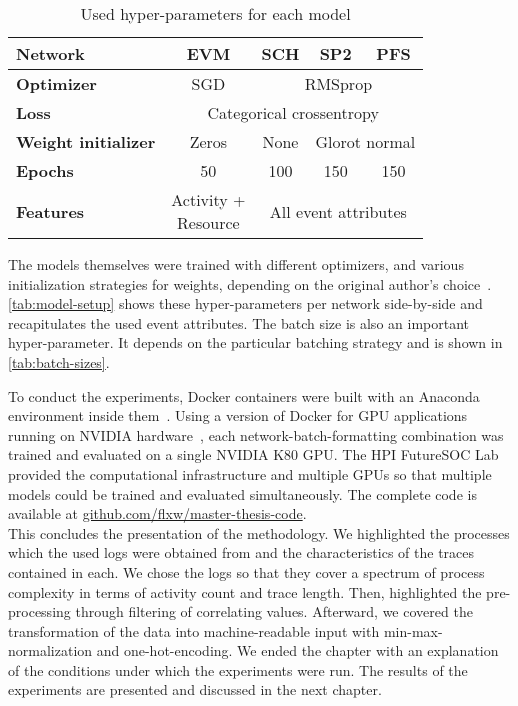 \begin{table}[!htb]
\centering
\begin{tabular}{lcccc}
\textbf{Network}&\textbf{EVM}&\textbf{SCH}&\textbf{SP2}&\textbf{PFS}\\
\midrule
\textbf{Optimizer} & SGD & \multicolumn{3}{c}{RMSprop} \\
\textbf{Loss}      &\multicolumn{4}{c}{Categorical crossentropy}\\
\textbf{Weight initializer} & Zeros & None & \multicolumn{2}{c}{Glorot normal}\\
\textbf{Epochs}    & 50 & 100 & 150 & 150\\
\textbf{Features}  & \makecell{Activity +\\Resource} & \multicolumn{3}{c}{All event attributes}\\
\end{tabular}
\caption{Used hyper-parameters for each model}
\label{tab:model-setup}
\end{table}

The models themselves were trained with different optimizers, and various initialization strategies for weights, depending on the original author's choice~\cite{evermann2016, schoenig2018}. \autoref{tab:model-setup} shows these hyper-parameters per network side-by-side and recapitulates the used event attributes. The batch size is also an important hyper-parameter. It depends on the particular batching strategy and is shown in \autoref{tab:batch-sizes}.

To conduct the experiments, Docker containers were built with an Anaconda environment inside them~\cite{web:docker}. Using a version of Docker for GPU applications running on NVIDIA hardware~\cite{web:nvidia-docker}, each network-batch-formatting combination was trained and evaluated on a single NVIDIA K80 GPU. The HPI FutureSOC Lab~\cite{web:fsoc} provided the computational infrastructure and multiple GPUs so that multiple models could be trained and evaluated simultaneously. The complete code is available at \href{https://github.com/flxw/master-thesis-code}{github.com/flxw/master-thesis-code}.\\

This concludes the presentation of the methodology.
We highlighted the processes which the used logs were obtained from and the
characteristics of the traces contained in each.
We chose the logs so that they cover a spectrum of process complexity in terms of activity count and trace length.
Then, highlighted the pre-processing through filtering of correlating values.
Afterward, we covered the transformation of the data into machine-readable input with min-max-normalization and one-hot-encoding.
We ended the chapter with an explanation of the conditions under which the experiments were run.
The results of the experiments are presented and discussed in the next chapter.

